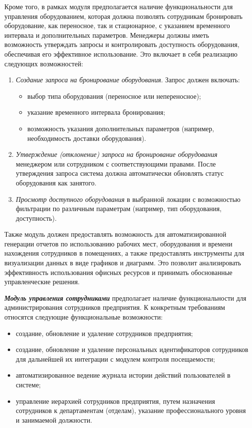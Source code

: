 Кроме того, в рамках модуля предполагается наличие функциональности для управления оборудованием, которая должна позволять сотрудникам бронировать оборудование, как переносное, так и стационарное, с указанием временного интервала и дополнительных параметров. Менеджеры должны иметь возможность утверждать запросы и контролировать доступность оборудования, обеспечивая его эффективное использование. Это включает в себя реализацию следующих возможностей:

\begin{enumerate}
    \item \textit{Создание запроса на бронирование оборудования}. Запрос должен включать:
        \begin{itemize}
            \item выбор типа оборудования (переносное или непереносное);
            \item указание временного интервала бронирования;
            \item возможность указания дополнительных параметров (например, необходимость доставки оборудования).
        \end{itemize}

    \item \textit{Утверждение (отклонение) запроса на бронирование оборудования} менеджером или сотрудником с соответствующими правами. После утверждения запроса система должна автоматически обновлять статус оборудования как занятого.

    \item \textit{Просмотр доступного оборудования} в выбранной локации с возможностью фильтрации по различным параметрам (например, тип оборудования, доступность).
\end{enumerate}

Также модуль должен предоставлять возможность для автоматизированной генерации отчетов по использованию рабочих мест, оборудования и времени нахождения сотрудников в помещениях, а также предоставлять инструменты для визуализации данных в виде графиков и диаграмм. Это позволит анализировать эффективность использования офисных ресурсов и принимать обоснованные управленческие решения.


\textit{\textbf{Модуль управления сотрудниками}} предполагает наличие функциональности для администрирования сотрудников предприятия. К конкретным требованиям относятся следующие функциональные возможности:

\begin{itemize}
    \item создание, обновление и удаление сотрудников предприятия;
    \item создание, обновление и удаление персональных идентификаторов сотрудников для дальнейшей их интеграции с модулем контроля посещаемости;
    \item автоматизированное ведение журнала истории действий пользователей в системе;
    \item управление иерархией сотрудников предприятия, путем назначения сотрудников к департаментам (отделам), указание профессионального уровня и занимаемой должности.
\end{itemize}


